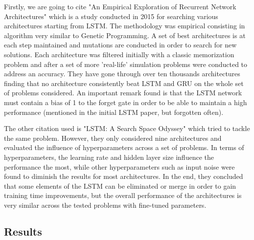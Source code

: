 Firstly, we are going to cite "An Empirical Exploration of Recurrent Network Architectures" \cite{jozefowicz2015empirical} which is a study conducted in 2015 for searching various architectures starting from LSTM. The methodology was empirical consisting in algorithm very similar to Genetic Programming. A set of best architectures is at each step maintained and mutations are conducted in order to search for new solutions. Each architecture was filtered initially with a classic memorization problem and after a set of more 'real-life' simulation problems were conducted to address an accuracy. They have gone through over ten thousands architectures finding that no architecture consistently beat LSTM and GRU on the whole set of problems considered. An important remark found is that the LSTM network must contain a bias of 1 to the forget gate in order to be able to maintain a high performance (mentioned in the initial LSTM paper, but forgotten often).

The other citation used is "LSTM: A Search Space Odyssey" \cite{greff2016lstm} which tried to tackle the same problem. However, they only considered nine architectures and evaluated the influence of hyperparameters across a set of problems. In terms of hyperparameters, the learning rate and hidden layer size influence the performance the most, while other hyperparameters such as input noise were found to diminish the results for most architectures. In the end, they concluded that some elements of the LSTM can be eliminated or merge in order to gain training time improvements, but the overall performance of the architectures is very similar across the tested problems with fine-tuned parameters.


\subsection{Results}
